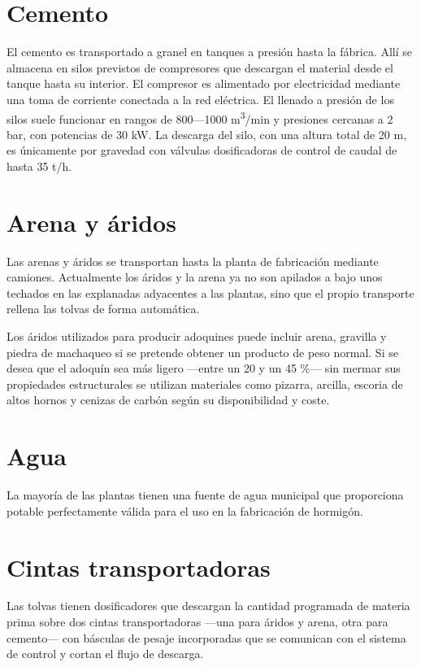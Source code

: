 \section{Cemento}
El cemento es transportado a granel en tanques a presión hasta la fábrica. Allí se almacena en silos previstos de compresores que descargan el material desde el tanque hasta su interior. El compresor es alimentado por electricidad mediante una toma de corriente conectada a la red eléctrica. El llenado a presión de los silos suele funcionar en rangos de 800—1000 \si{\cubic\meter/\minute} y presiones cercanas a 2 \si{\bar}, con potencias de 30 \si{\kilo\watt}. La descarga del silo, con una altura total de 20 \si{\meter}, es únicamente por gravedad con válvulas dosificadoras de control de caudal de hasta 35 \si{\tonne/\hour}.

\section{Arena y áridos}
Las arenas y áridos se transportan hasta la planta de fabricación mediante camiones. Actualmente los áridos y la arena ya no son apilados a bajo unos techados en las explanadas adyacentes a las plantas, sino que el propio transporte rellena las tolvas de forma automática.

Los áridos utilizados para producir adoquines puede incluir arena, gravilla y piedra de machaqueo si se pretende obtener un producto de peso normal. Si se desea que el adoquín sea más ligero —entre un 20 y un 45 \%— sin mermar sus propiedades estructurales se utilizan materiales como pizarra, arcilla, escoria de altos hornos y cenizas de carbón según su disponibilidad y coste.

\section{Agua}
La mayoría de las plantas tienen una fuente de agua municipal que proporciona potable perfectamente válida para el uso en la fabricación de hormigón.

\section{Cintas transportadoras}

Las tolvas tienen dosificadores que descargan la cantidad programada de materia prima sobre dos cintas transportadoras —una para áridos y arena, otra para cemento— con básculas de pesaje incorporadas que se comunican con el sistema de control y cortan el flujo de descarga.

